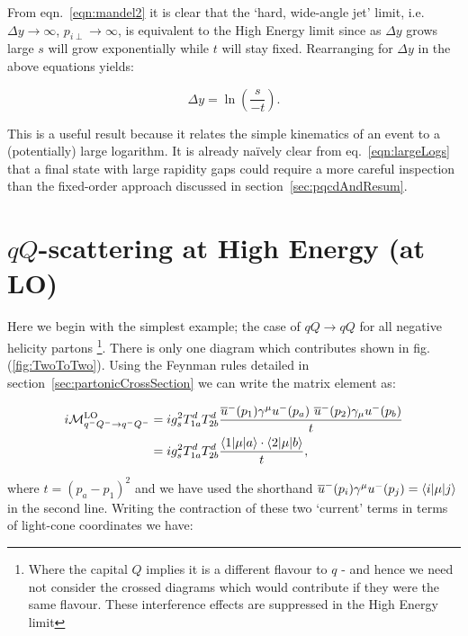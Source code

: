 		From  eqn.~\eqref{eqn:mandel2} it is clear that the `hard, wide-angle jet' limit, i.e. $\Delta y\to\infty$,
		$p_{i\perp}\to\infty$, is equivalent to the High Energy limit since as $\Delta y$ grows large $s$ will
		grow exponentially while $t$ will stay fixed.  Rearranging for $\Delta y$ in the above equations yields:

		\begin{equation}
			\Delta y = \ln \left(\frac{s}{-t}\right).
			\label{eqn:largeLogs}
		\end{equation}

		This is a useful result because it relates the simple kinematics of an event to a (potentially)
		large logarithm.  It is already na\"ively clear from eq.~\eqref{eqn:largeLogs} that a final state
		with large rapidity gaps could require a more careful inspection than the fixed-order approach
		discussed in section~\ref{sec:pqcdAndResum}.

	\section{$qQ$-scattering at High Energy (at LO)}
		\label{sec:qQScat}

		Here we begin with the simplest example; the case of $qQ\rightarrow qQ$ for all negative helicity partons
		\footnote{Where the capital $Q$ implies it is a different flavour to $q$ - and hence we need not consider the crossed
		diagrams which would contribute if they were the same flavour.  These interference effects are suppressed
		in the High Energy limit}. There is only one diagram which contributes shown
		in fig. (\ref{fig:TwoToTwo}).  Using the Feynman rules detailed in section~\ref{sec:partonicCrossSection} we can
		write the matrix element as:

		\begin{align}
			i\mathcal{M}_{q^-Q^-\rightarrow q^-Q^-}^{\text{LO}} &= ig_s^2T^d_{1a}T^d_{2b}\frac{\overline{u}^-(p_1)\gamma^\mu
			  u^-(p_a)\text{ }\overline{u}^-(p_2)\gamma_\mu u^-(p_b)}{t}\\
			  &= ig_s^2T^d_{1a}T^d_{2b}\frac{\langle 1 | \mu | a \rangle\cdot\langle 2 | \mu | b \rangle}{t},
			  \label{eqn:similarBrackets}
		\end{align}

		where $t = (p_a - p_1)^2$ and we have used the shorthand $\overline{u}^-(p_i)\gamma^\mu u^-(p_j) = \langle i | \mu | j \rangle$ in the second line.
		Writing the contraction of these two `current' terms in terms of light-cone coordinates we have:

